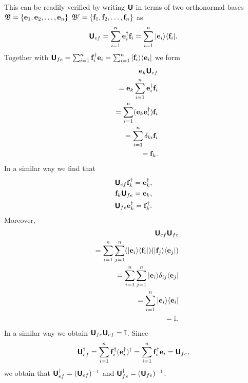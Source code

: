 This can be readily verified \cite{Schwinger.60} by writing $\textsf{\textbf{U}}$
in terms of two orthonormal bases
${\frak B}=\{{\bf e}_1,  {\bf e}_2, \ldots , {\bf e}_n\}$
${\frak B}'=\{{\bf f}_1,  {\bf f}_2, \ldots , {\bf f}_n\}$ as
\begin{equation}
\textsf{\textbf{U}}_{ef}= \sum_{i=1}^n  {\bf e}_i^\dagger {\bf f}_i
=  \sum_{i=1}^n  \vert {\bf e}_i\rangle \langle {\bf f}_i \vert
.
\end{equation}
Together with $\textsf{\textbf{U}}_{fe}= \sum_{i=1}^n  {\bf f}_i^\dagger {\bf e}_i=  \sum_{i=1}^n  \vert {\bf f}_i\rangle \langle {\bf e}_i \vert $
we form
\begin{equation}
\begin{split}
{\bf e}_k \textsf{\textbf{U}}_{ef}\\
\quad = {\bf e}_k\sum_{i=1}^n  {\bf e}_i^\dagger {\bf f}_i \\
\quad
= \sum_{i=1}^n  ({\bf e}_k{\bf e}_i^\dagger) {\bf f}_i \\
\quad
= \sum_{i=1}^n  \delta_{ki} {\bf f}_i \\
\quad  = {\bf f}_k
.
\end{split}
\end{equation}
In a similar way we find that
\begin{equation}
\begin{split}
\textsf{\textbf{U}}_{ef} {\bf f}_k^\dagger = {\bf e}_k^\dagger,\\
{\bf f}_k\textsf{\textbf{U}}_{fe}   = {\bf e}_k,\\
\textsf{\textbf{U}}_{fe} {\bf e}_k^\dagger = {\bf f}_k^\dagger.
\end{split}
\end{equation}
Moreover,
\begin{equation}
\begin{split}
\textsf{\textbf{U}}_{ef}\textsf{\textbf{U}}_{fe}\\
\quad
=
 \sum_{i=1}^n  \sum_{j=1}^n
(\vert {\bf e}_i\rangle \langle {\bf f}_i \vert )
(\vert {\bf f}_j\rangle \langle {\bf e}_j \vert )\\
\quad
=
 \sum_{i=1}^n  \sum_{j=1}^n
\vert {\bf e}_i\rangle \delta_{ij} \langle {\bf e}_j \vert \\
\quad
=
 \sum_{i=1}^n
\vert {\bf e}_i\rangle   \langle {\bf e}_i \vert \\
\quad
=
{\Bbb I}
.
\end{split}
\end{equation}
In a similar way we obtain
$\textsf{\textbf{U}}_{fe}\textsf{\textbf{U}}_{ef}=
{\Bbb I}$.
Since
\begin{equation}
\textsf{\textbf{U}}_{ef}^\dagger = \sum_{i=1}^n  {\bf f}_i^\dagger ( {\bf e}_i^\dagger)^\dagger
= \sum_{i=1}^n  {\bf f}_i^\dagger {\bf e}_i
= \textsf{\textbf{U}}_{fe},
\end{equation}
we obtain that $\textsf{\textbf{U}}_{ef}^\dagger = (\textsf{\textbf{U}}_{ef})^{-1}$
and $\textsf{\textbf{U}}_{fe}^\dagger = (\textsf{\textbf{U}}_{fe})^{-1}$.

